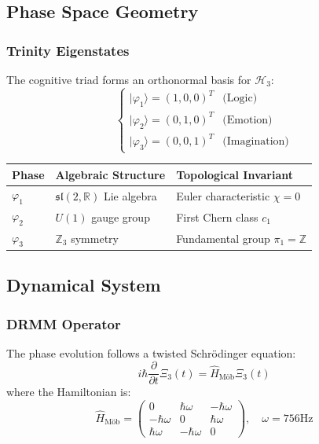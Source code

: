 \documentclass[12pt]{article}
\begin{document}
\subsection{Phase Space Geometry}

\subsubsection{Trinity Eigenstates}
The cognitive triad forms an orthonormal basis for \( \mathcal{H}_3 \):
\[
\begin{cases}
|\varphi_1\rangle = (1, 0, 0)^T & \text{(Logic)} \\
|\varphi_2\rangle = (0, 1, 0)^T & \text{(Emotion)} \\
|\varphi_3\rangle = (0, 0, 1)^T & \text{(Imagination)}
\end{cases}
\]

\begin{table}[h]
\centering
\begin{tabular}{|l|l|l|}
\hline
\textbf{Phase} & \textbf{Algebraic Structure} & \textbf{Topological Invariant} \\ \hline
\(\varphi_1\) & \(\mathfrak{sl}(2,\mathbb{R})\) Lie algebra & Euler characteristic \(\chi = 0\) \\ \hline
\(\varphi_2\) & \(U(1)\) gauge group & First Chern class \(c_1\) \\ \hline
\(\varphi_3\) & \(\mathbb{Z}_3\) symmetry & Fundamental group \(\pi_1 = \mathbb{Z}\) \\ \hline
\end{tabular}
\end{table}

\subsection{Dynamical System}

\subsubsection{DRMM Operator}
The phase evolution follows a twisted Schrödinger equation:
\[
i\hbar \frac{\partial}{\partial t} \Xi_3(t) = \hat{H}_{\text{Möb}} \Xi_3(t)
\]
where the Hamiltonian is:
\[
\hat{H}_{\text{Möb}} = \begin{pmatrix}
0 & \hbar\omega & -\hbar\omega \\
-\hbar\omega & 0 & \hbar\omega \\
\hbar\omega & -\hbar\omega & 0
\end{pmatrix}, \quad \omega = 756 \text{Hz}
\]
\end{document}
